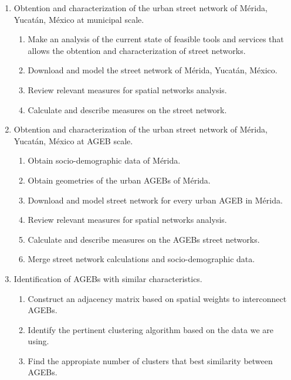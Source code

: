 \begin{enumerate}
\item Obtention and characterization of the urban street network of Mérida, Yucatán, México at municipal scale.
\begin{enumerate}
    \item Make an analysis of the current state of feasible tools and services that allows the obtention and characterization of street networks.
    \item Download and model the street network of Mérida, Yucatán, México.
    \item Review relevant measures for spatial networks analysis.
    \item Calculate and describe measures on the street network.
\end{enumerate}


\item Obtention and characterization of the urban street network of Mérida, Yucatán, México at AGEB scale.
\begin{enumerate}
	\item Obtain socio-demographic data of Mérida.
	\item Obtain geometries of the urban AGEBs of Mérida.
	\item Download and model street network for every urban AGEB in Mérida.
	\item Review relevant measures for spatial networks analysis.
	\item Calculate and describe measures on the AGEBs street networks.
	\item Merge street network calculations and socio-demographic data.
\end{enumerate}


\item Identification of AGEBs with similar characteristics. 
\begin{enumerate}
	\item Construct an adjacency matrix based on spatial weights to interconnect AGEBs.
	\item Identify the pertinent clustering algorithm based on the data we are using.
	\item Find the appropiate number of clusters that best similarity between AGEBs.
\end{enumerate}
\end{enumerate}


